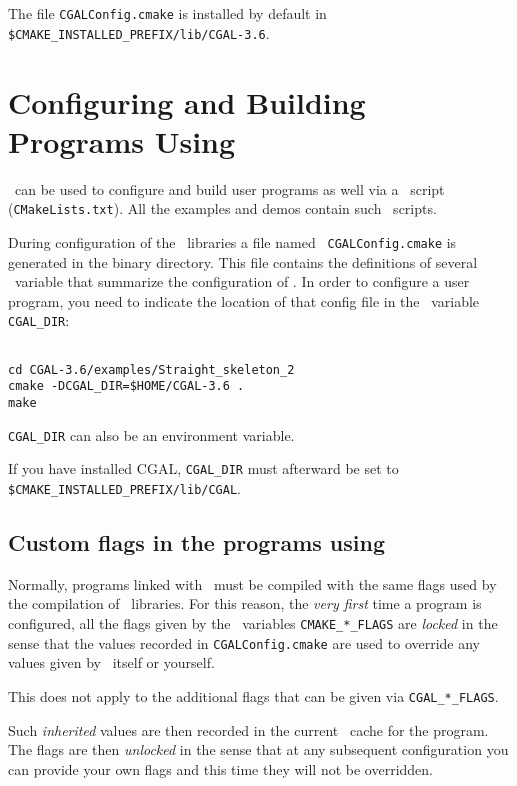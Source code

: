 The file \texttt{CGALConfig.cmake} is installed by default in
\texttt{\$CMAKE\_INSTALLED\_PREFIX/lib/CGAL-3.6}.


\section{Configuring and Building Programs Using \cgal}

\cmake\ can be used to configure and build user programs as well via a \cmake\ 
script ({\tt CMakeLists.txt}).  All the examples and
demos contain such \cmake\ scripts.

During configuration of the \cgal\ libraries a file named {\tt
CGALConfig.cmake} is generated in the binary directory. This file
contains the definitions of several \cmake\ variable that summarize the
configuration of \cgal. In order to configure a user program, you need
to indicate the location of that config file in the \cmake\ variable
\texttt{CGAL\_DIR}:

{\ccTexHtml{\scriptsize}{}
\begin{verbatim}

cd CGAL-3.6/examples/Straight_skeleton_2
cmake -DCGAL_DIR=$HOME/CGAL-3.6 .
make

\end{verbatim}
}

\texttt{CGAL\_DIR} can also be an environment variable.

If you have installed CGAL, \texttt{CGAL\_DIR} must afterward be set to
\texttt{\$CMAKE\_INSTALLED\_PREFIX/lib/CGAL}.

\subsection{Custom flags in the programs using \cgal}

Normally, programs linked with \cgal\ must be compiled with the same flags
used by the compilation of \cgal\
libraries. For this reason, the {\em very first} time
a program is configured, all the flags given by the \cmake\ variables \texttt{CMAKE\_*\_FLAGS}
are {\em locked} in the sense that the values recorded in \texttt{CGALConfig.cmake} 
are used to override any values given by \cmake\ itself or yourself.

This does not apply to the additional flags that can be given via \texttt{CGAL\_*\_FLAGS}.

Such {\em inherited} values are then recorded in the current \cmake\ cache for the program.
The flags are then {\em unlocked} in the sense that at any subsequent configuration you can
provide your own flags and this time they will not be overridden.

